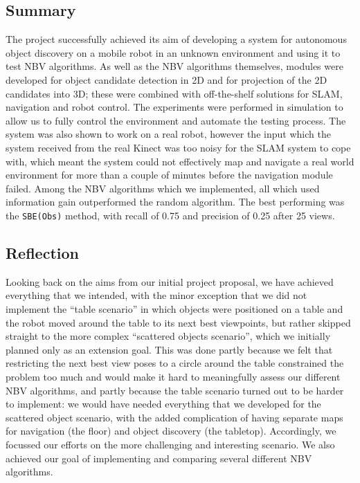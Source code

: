 

\subsection{Summary}

The project successfully achieved its aim of developing a system for autonomous object discovery on a mobile robot in an unknown environment and using it to test NBV algorithms.
As well as the NBV algorithms themselves, modules were developed for object candidate detection in 2D and for projection of the 2D candidates into 3D; these were combined with off-the-shelf solutions for SLAM, navigation and robot control.
The experiments were performed in simulation to allow us to fully control the environment and automate the testing process.
The system was also shown to work on a real robot, however the input which the system received from the real Kinect was too noisy for the SLAM system to cope with, which meant the system could not effectively map and navigate a real world environment for more than a couple of minutes before the navigation module failed.
Among the NBV algorithms which we implemented, all which used information gain outperformed the random algorithm.
The best performing was the \texttt{SBE(Obs)} method, with recall of \num{0.75} and precision of \num{0.25} after \num{25} views.

\subsection{Reflection}
\label{ssec:reflection}

Looking back on the aims from our initial project proposal, we have achieved everything that we intended, with the minor exception that we did not implement the ``table scenario'' in which objects were positioned on a table and the robot moved around the table to its next best viewpoints, but rather skipped straight to the more complex ``scattered objects scenario'', which we initially planned only as an extension goal.
This was done partly because we felt that restricting the next best view poses to a circle around the table constrained the problem too much and would make it hard to meaningfully assess our different NBV algorithms, and partly because the table scenario turned out to be harder to implement: we would have needed everything that we developed for the scattered object scenario, with the added complication of having separate maps for navigation (the floor) and object discovery (the tabletop).
Accordingly, we focussed our efforts on the more challenging and interesting scenario.
We also achieved our goal of implementing and comparing several different NBV algorithms.

